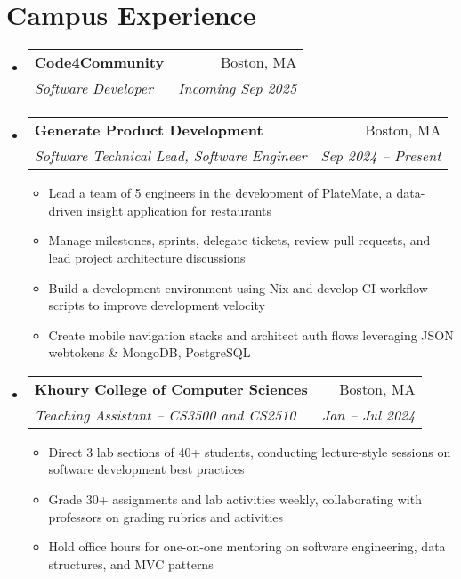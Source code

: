 \documentclass[letterpaper,11pt]{article}
\makeatletter
\newcommand{\resumeItem}[1]{
  \item\small{
    {#1 \vspace{-2pt}}
  }
}
\newcommand{\resumeSubheading}[4]{
  \vspace{-10pt}\item
    \begin{tabular*}{1.0\textwidth}[t]{l@{\extracolsep{\fill}}r}
      \textbf{#1} & \small #2 \\
      \textit{\small#3} & \textit{\small #4} \\
    \end{tabular*}\vspace{-5pt}
}
\newcommand{\resumeSubHeadingListStart}{\begin{itemize}[leftmargin=0.0in, label={}]}
\newcommand{\resumeSubHeadingListEnd}{\end{itemize}}
\newcommand{\resumeItemListStart}{\begin{itemize}}
\newcommand{\resumeItemListEnd}{\end{itemize}}
\makeatother
\begin{document}
\section{Campus Experience}
    \resumeSubHeadingListStart
        \resumeSubheading
        {Code4Community}{Boston, MA}
        {Software Developer}{Incoming Sep 2025}
        \vspace{6pt}
        \resumeSubheading 
        {Generate Product Development}{Boston, MA}
        {Software Technical Lead, Software Engineer}{Sep 2024 – Present}
        \resumeItemListStart
            \resumeItem{Lead a team of 5 engineers in the development of PlateMate, a data-driven insight application for restaurants}
            \resumeItem{Manage milestones, sprints, delegate tickets, review pull requests, and lead project architecture discussions}
            \resumeItem{Build a development environment using Nix and develop CI workflow scripts to improve development velocity}
            \resumeItem{Create mobile navigation stacks and architect auth flows leveraging JSON webtokens \& MongoDB, PostgreSQL}
        \resumeItemListEnd
        \vspace{6pt}
        \resumeSubheading
        {Khoury College of Computer Sciences}{Boston, MA}
        {Teaching Assistant – CS3500 and CS2510}{Jan – Jul 2024}
        \resumeItemListStart
            \resumeItem{Direct 3 lab sections of 40+ students, conducting lecture-style sessions on software development best practices}
            \resumeItem{Grade 30+ assignments and lab activities weekly, collaborating with professors on grading rubrics and activities}
            \resumeItem{Hold office hours for one-on-one mentoring on software engineering, data structures, and MVC patterns}
        \resumeItemListEnd
   \resumeSubHeadingListEnd
\vspace{-14pt}

\end{document}
